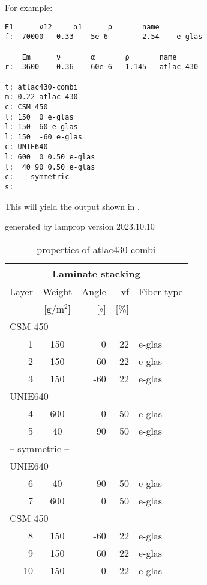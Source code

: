 \documentclass[a4paper,landscape,oneside,11pt,twocolumn]{memoir}
\begin{document}
For example:
\begin{lstlisting}[style=plain]
    E1      ν12     α1      ρ       name
f:  70000   0.33    5e-6        2.54    e-glas

    Em      ν       α       ρ       name
r:  3600    0.36    60e-6   1.145   atlac-430

t: atlac430-combi
m: 0.22 atlac-430
c: CSM 450
l: 150  0 e-glas
l: 150  60 e-glas
l: 150  -60 e-glas
c: UNIE640
l: 600  0 0.50 e-glas
l:  40 90 0.50 e-glas
c: -- symmetric --
s:
\end{lstlisting}

This will yield the output shown in .


\begin{table}[!htbp]
  \caption{\label{tab:atlac430-combi}properties of atlac430-combi}
  \centering\footnotesize{\rule{0pt}{10pt}
  \tiny generated by lamprop version 2023.10.10\\[3pt]}
    \begin{tabular}[t]{rcrrl}
      \multicolumn{5}{c}{\small\textbf{Laminate stacking}}\\[0.1em]
      \toprule %
      Layer & Weight & Angle & vf & Fiber type\\
            & [g/m$^2$] & [$\circ$] & [\%]\\
      \midrule
\multicolumn{5}{l}{CSM 450}\\
      1 &  150 &     0 & 22 & e-glas\\
      2 &  150 &    60 & 22 & e-glas\\
      3 &  150 &   -60 & 22 & e-glas\\
\multicolumn{5}{l}{UNIE640}\\
      4 &  600 &     0 & 50 & e-glas\\
      5 &   40 &    90 & 50 & e-glas\\
\multicolumn{5}{l}{-- symmetric --}\\
\multicolumn{5}{l}{UNIE640}\\
      6 &   40 &    90 & 50 & e-glas\\
      7 &  600 &     0 & 50 & e-glas\\
\multicolumn{5}{l}{CSM 450}\\
      8 &  150 &   -60 & 22 & e-glas\\
      9 &  150 &    60 & 22 & e-glas\\
      10 &  150 &     0 & 22 & e-glas\\
      \bottomrule
    \end{tabular}\hspace{0.02\textwidth}

\end{table}
\end{document}
